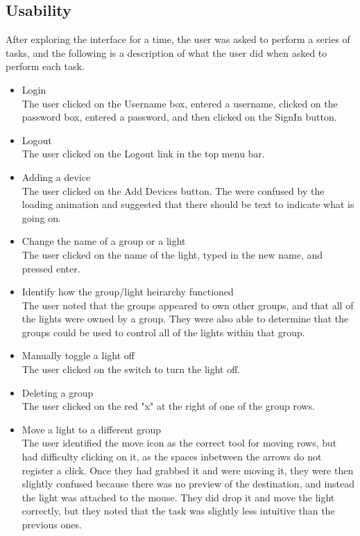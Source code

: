 \documentclass[oneside,openright]{book}
\begin{document}
\subsection{Usability}
After exploring the interface for a time, the user was asked to perform a series of tasks, and the following is a description of what the user did when asked to perform each task.
\begin{itemize}
  \item Login \\
    The user clicked on the Username box, entered a username, clicked on the password box, entered a password, and then clicked on the SignIn button.
  \item Logout \\
    The user clicked on the Logout link in the top menu bar.
  \item Adding a device \\
    The user clicked on the Add Devices button. The were confused by the loading animation and suggested that there should be text to indicate what is going on.
  \item Change the name of a group or a light \\
    The user clicked on the name of the light, typed in the new name, and pressed enter.
  \item Identify how the group/light heirarchy functioned \\
    The user noted that the groups appeared to own other groups, and that all of the lights were owned by a group. They were also able to determine that the groups could be used to control all of the lights within that group.
  \item Manually toggle a light off \\
    The user clicked on the switch to turn the light off.
  \item Deleting a group \\
    The user clicked on the red "x" at the right of one of the group rows.
  \item Move a light to a different group \\
    The user identified the move icon as the correct tool for moving rows, but had difficulty clicking on it, as the spaces inbetween the arrows do not register a click. Once they had grabbed it and were moving it, they were then slightly confused because there was no preview of the destination, and instead the light was attached to the mouse. They did drop it and move the light correctly, but they noted that the task was slightly less intuitive than the previous ones.

\end{itemize}
\end{document}
